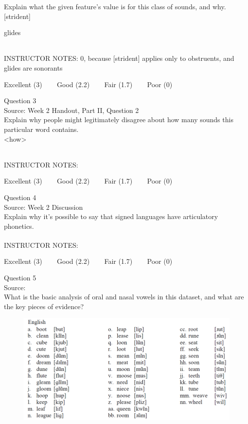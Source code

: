 \documentclass[12pt]{article}
\begin{document}
Explain what the given feature’s value is for this class of sounds, and why.\\

{[strident]}

glides


~\\
INSTRUCTOR NOTES: 0, because [strident] applies only to obstruents, and glides are sonorants


\vfill
Excellent (3) ~~~ Good (2.2) ~~~ Fair (1.7) ~~~ Poor (0)
\newpage

{\large Question 3}\\

Source: Week 2 Handout, Part II, Question 2\\

Explain why people might legitimately disagree about how many sounds this particular word contains.\\

<how>


~\\
INSTRUCTOR NOTES: 


\vfill
Excellent (3) ~~~ Good (2.2) ~~~ Fair (1.7) ~~~ Poor (0)
\newpage

{\large Question 4}\\

Source: Week 2 Discussion\\

Explain why it's possible to say that signed languages have articulatory phonetics.\\


~\\
INSTRUCTOR NOTES: 


\vfill
Excellent (3) ~~~ Good (2.2) ~~~ Fair (1.7) ~~~ Poor (0)
\newpage

{\large Question 5}\\

Source: \\

What is the basic analysis of oral and nasal vowels in this dataset, and what are the key pieces of evidence?\\

\begin{figure}[H]
\includegraphics{../images/english12.png}
\end{figure}
\end{document}
